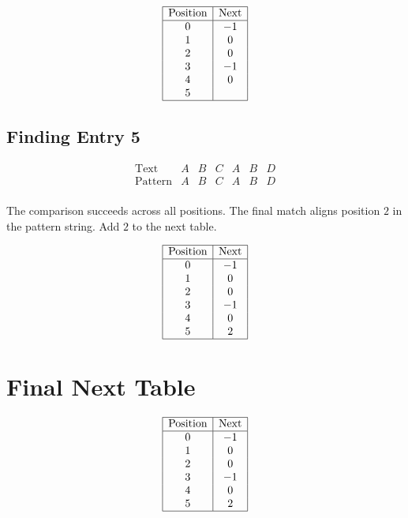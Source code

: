 \documentclass[a4paper,12pt]{article}
\begin{document}
\[
\begin{array}{|c|c|}
\hline
\text{Position} & \text{Next} \\
\hline
0 & -1 \\
1 & 0 \\
2 & 0 \\
3 & -1 \\
4 & 0 \\
5 &  \\
\hline
\end{array}
\]

\subsection*{Finding Entry 5}
\[
\begin{array}{c|c|c|c|c|c|c|}
\text{Text} & A & B & C & A & B & D \\
\hline
\text{Pattern} & A & B & C & A & B & D \\
\end{array}
\]

\begin{tcolorbox}[colback=blue!5, colframe=blue!75!black, title=Explanation]
The comparison succeeds across all positions. The final match aligns position \(2\) in the pattern string. Add \(2\) to the next table.
\end{tcolorbox}

\[
\begin{array}{|c|c|}
\hline
\text{Position} & \text{Next} \\
\hline
0 & -1 \\
1 & 0 \\
2 & 0 \\
3 & -1 \\
4 & 0 \\
5 & 2 \\
\hline
\end{array}
\]

\section*{Final Next Table}
\[
\begin{array}{|c|c|}
\hline
\text{Position} & \text{Next} \\
\hline
0 & -1 \\
1 & 0 \\
2 & 0 \\
3 & -1 \\
4 & 0 \\
5 & 2 \\
\hline
\end{array}
\]
\end{document}
